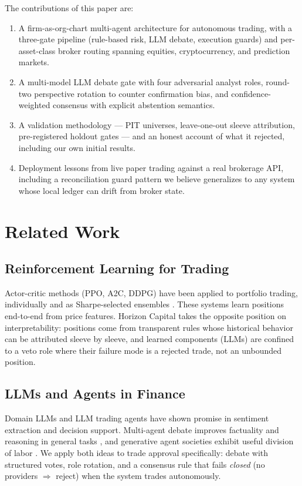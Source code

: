 \documentclass[10pt,twocolumn]{IEEEtran}
\begin{document}
The contributions of this paper are:
\begin{enumerate}
\item A firm-as-org-chart multi-agent architecture for autonomous trading,
with a three-gate pipeline (rule-based risk, LLM debate, execution guards)
and per-asset-class broker routing spanning equities, cryptocurrency, and
prediction markets.
\item A multi-model LLM debate gate with four adversarial analyst roles,
round-two perspective rotation to counter confirmation bias, and
confidence-weighted consensus with explicit abstention semantics.
\item A validation methodology --- PIT universes, leave-one-out sleeve
attribution, pre-registered holdout gates --- and an honest account of what
it rejected, including our own initial results.
\item Deployment lessons from live paper trading against a real brokerage
API, including a reconciliation guard pattern we believe generalizes to any
system whose local ledger can drift from broker state.
\end{enumerate}

\section{Related Work}

\subsection{Reinforcement Learning for Trading}
Actor-critic methods (PPO, A2C, DDPG) have been applied to portfolio
trading, individually and as Sharpe-selected ensembles
\cite{yang2020ensemble,xiong2018practical,jiang2017cryptocurrency}. These
systems learn positions end-to-end from price features. Horizon Capital
takes the opposite position on interpretability: positions come from
transparent rules whose historical behavior can be attributed sleeve by
sleeve, and learned components (LLMs) are confined to a veto role where
their failure mode is a rejected trade, not an unbounded position.

\subsection{LLMs and Agents in Finance}
Domain LLMs \cite{wu2023bloomberggpt,yang2023fingpt} and LLM trading agents
have shown promise in sentiment extraction and decision support. Multi-agent
debate improves factuality and reasoning in general tasks
\cite{du2023improving}, and generative agent societies exhibit useful
division of labor \cite{park2023generative}. We apply both ideas to trade
approval specifically: debate with structured votes, role rotation, and a
consensus rule that fails \emph{closed} (no providers $\Rightarrow$ reject)
when the system trades autonomously.
\end{document}
